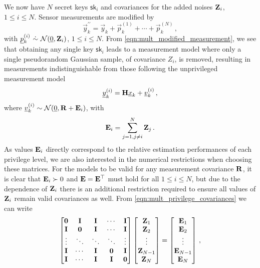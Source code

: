 \documentclass[letterpaper, 10 pt, conference]{ieeeconf}
\begin{document}
We now have $N$ secret keys $\mathsf{sk}_i$ and covariances for the added noises ${{\mathbf{Z}}}_i$, $1\leq i \leq N$. Sensor measurements are modified by
\begin{equation}\label{eqn:mult_modified_measurement}
   \vec{y}_k^{\prime\prime} = \vec{y}_k + \vec{p}^{(1)}_k + \cdots + \vec{p}^{(N)}_k\,,
\end{equation}
with $\vec{p}^{(i)}_k\ \dot{\sim}\ \mathcal{N}(\vec{0}, \mat{Z}_i)$, $1\leq i \leq N$. From \eqref{eqn:mult_modified_measurement}, we see that obtaining any single key $\mathsf{sk}_i$ leads to a measurement model where only a single pseudorandom Gaussian sample, of covariance $Z_i$, is removed, resulting in measurements indistinguishable from those following the unprivileged measurement model
\begin{equation}
   {\underline{y}}_k^{(i)} = {{\mathbf{H}}}{\underline{x}}_k + {\underline{v}}^{(i)}_k\,,
\end{equation}
where ${\underline{v}}^{(i)}_k\sim \mathcal{N}({\underline{0}},{{\mathbf{R}}}+{{\mathbf{E}}}_i)$, with
\begin{equation}\label{eqn:mult_privilege_covariances}
   {\ensuremath{{\mathbf{E}}}}_i = \sum^N_{j=1,j \neq i}{{\mathbf{Z}}}_j\,.
\end{equation}
As values ${{\mathbf{E}}}_i$ directly correspond to the relative estimation performances of each privilege level, we are also interested in the numerical restrictions when choosing these matrices. For the models to be valid for any measurement covariance ${{\mathbf{R}}}$, it is clear that ${{\mathbf{E}}}_i\succ 0$ and ${{\mathbf{E}}}={{\mathbf{E}}}^\top$ must hold for all $1\leq i\leq N$, but due to the dependence of ${{\mathbf{Z}}}_i$ there is an additional restriction required to ensure all values of ${{\mathbf{Z}}}_i$ remain valid covariances as well. From \eqref{eqn:mult_privilege_covariances} we can write
\begin{equation}
   \begin{bmatrix}
      {\ensuremath{{\mathbf{0}}}} & {{\mathbf{I}}} & {{\mathbf{I}}} & \cdots & {{\mathbf{I}}}\\
      {{\mathbf{I}}} & {{\mathbf{0}}} & {{\mathbf{I}}} & \cdots & {{\mathbf{I}}}\\
      \vdots & \ddots & \ddots & \ddots & \vdots\\
      {{\mathbf{I}}} & \cdots & {{\mathbf{I}}} & {{\mathbf{0}}} & {{\mathbf{I}}}\\
      {{\mathbf{I}}} & \cdots & {{\mathbf{I}}} & {{\mathbf{I}}} & {{\mathbf{0}}}
   \end{bmatrix}
   \begin{bmatrix}
      {\ensuremath{{\mathbf{Z}}}}_1\\
      {{\mathbf{Z}}}_2\\
      \vdots\\
      {{\mathbf{Z}}}_{N-1}\\
      {{\mathbf{Z}}}_N
   \end{bmatrix}
   =
   \begin{bmatrix}
      {\ensuremath{{\mathbf{E}}}}_1\\
      {{\mathbf{E}}}_2\\
      \vdots\\
      {{\mathbf{E}}}_{N-1}\\
      {{\mathbf{E}}}_N
   \end{bmatrix}\,,
\end{equation}
\end{document}
